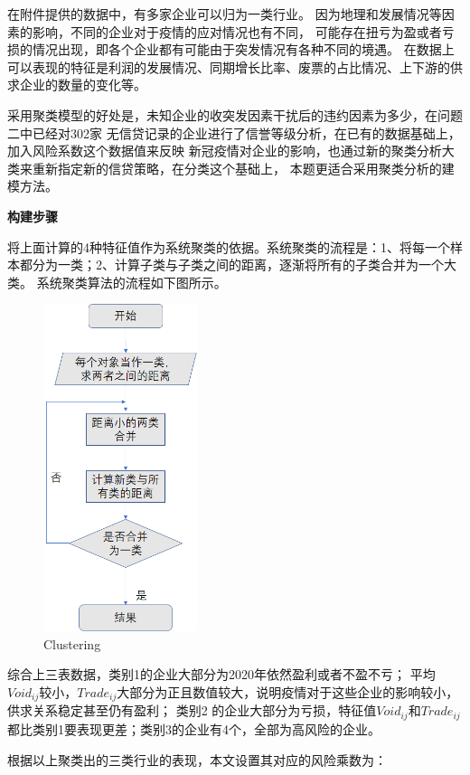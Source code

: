 \documentclass[UTF8]{ctexart}
\begin{document}
在附件提供的数据中，有多家企业可以归为一类行业。
因为地理和发展情况等因素的影响，不同的企业对于疫情的应对情况也有不同，
可能存在扭亏为盈或者亏损的情况出现，即各个企业都有可能由于突发情况有各种不同的境遇。
在数据上可以表现的特征是利润的发展情况、同期增长比率、废票的占比情况、上下游的供求企业的数量的变化等。

采用聚类模型的好处是，未知企业的收突发因素干扰后的违约因素为多少，在问题二中已经对302家
无信贷记录的企业进行了信誉等级分析，在已有的数据基础上，加入风险系数这个数据值来反映
新冠疫情对企业的影响，也通过新的聚类分析大类来重新指定新的信贷策略，在分类这个基础上，
本题更适合采用聚类分析的建模方法。

\textbf{构建步骤}

将上面计算的4种特征值作为系统聚类的依据。系统聚类的流程是：1、将每一个样本都分为一类；2、计算子类与子类之间的距离，逐渐将所有的子类合并为一个大类。
系统聚类算法的流程如下图所示。
\begin{figure}[H]\centering
	\includegraphics[width=0.4\textwidth,height=0.72\textwidth]{img/Clustering.png} %
	\caption{Clustering}
	\label{fig:figure 2} %
	\end{figure}



综合上三表数据，类别1的企业大部分为2020年依然盈利或者不盈不亏；
平均$Void_{ij}$较小，$Trade_{ij}$大部分为正且数值较大，说明疫情对于这些企业的影响较小，供求关系稳定甚至仍有盈利；
类别2 的企业大部分为亏损，特征值$Void_{ij}$和$Trade_{ij}$都比类别1要表现更差；类别3的企业有4个，全部为高风险的企业。

根据以上聚类出的三类行业的表现，本文设置其对应的风险乘数为：
\end{document}
